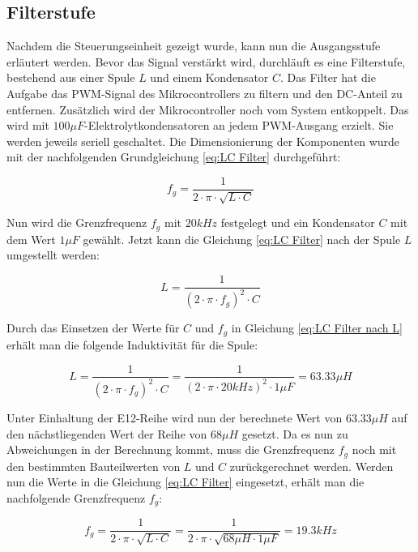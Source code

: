 \subsection{Filterstufe}\label{sec:filterstufe}
Nachdem die Steuerungseinheit gezeigt wurde, kann nun die Ausgangsstufe erläutert werden. Bevor das Signal verstärkt wird, durchläuft es eine Filterstufe, bestehend aus einer Spule $L$ und einem Kondensator $C$. Das Filter hat die Aufgabe das PWM-Signal des Mikrocontrollers zu filtern und den DC-Anteil zu entfernen. Zusätzlich wird der Mikrocontroller noch vom System entkoppelt. Das wird mit $100\mu F$-Elektrolytkondensatoren an jedem PWM-Ausgang erzielt. Sie werden jeweils seriell geschaltet. Die Dimensionierung der Komponenten wurde mit der nachfolgenden Grundgleichung \ref{eq:LC Filter} durchgeführt:
 
\begin{equation}
f_g = \frac{1}{2\cdot \pi \cdot \sqrt{L\cdot C}}
\label{eq:LC Filter}
\end{equation}

Nun wird die Grenzfrequenz $f_g$ mit $20 kHz$ festgelegt und ein Kondensator $C$ mit dem Wert $1\mu F$ gewählt. Jetzt kann die Gleichung \ref{eq:LC Filter} nach der Spule $L$ umgestellt werden:

\begin{equation}
L = \frac{1}{(2\cdot \pi \cdot f_g)^2\cdot C }
\label{eq:LC Filter nach L}
\end{equation}

Durch das Einsetzen der Werte für $C$ und $f_g$ in Gleichung \ref{eq:LC Filter nach L} erhält man die folgende Induktivität für die Spule:

\begin{equation}
L = \frac{1}{(2\cdot \pi \cdot f_g)^2\cdot C } = \frac{1}{(2\cdot \pi \cdot 20 kHz)^2\cdot 1 \mu F } = 63.33\mu H
\label{eq:LC Filter nach L 1}
\end{equation}

Unter Einhaltung der {\glqq E12-Reihe\grqq} wird nun der berechnete Wert von $63.33\mu H$ auf den nächstliegenden Wert der Reihe von $68\mu H$ gesetzt. Da es nun zu Abweichungen in der Berechnung kommt, muss die Grenzfrequenz $f_g$ noch mit den bestimmten Bauteilwerten von $L$ und $C$ zurückgerechnet werden. Werden nun die Werte in die Gleichung \ref{eq:LC Filter} eingesetzt, erhält man die nachfolgende Grenzfrequenz $f_g$:

\begin{equation}
f_g = \frac{1}{2\cdot \pi \cdot \sqrt{L\cdot C}} = \frac{1}{2\cdot \pi \cdot \sqrt{68\mu H \cdot 1 \mu F}} = 19.3 kHz
\label{eq:LC Filter 1}
\end{equation}

